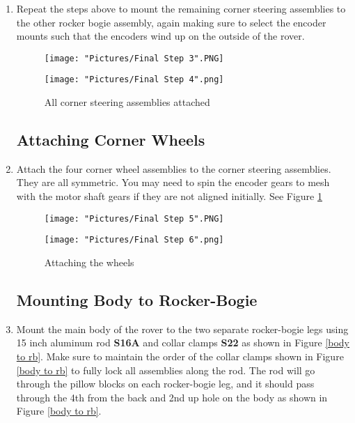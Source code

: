 \documentclass[12pt]{article}
\begin{document}
\begin{enumerate}
\item Repeat the steps above to mount the remaining corner steering assemblies to the other rocker bogie assembly, again making sure to select the encoder mounts such that the encoders wind up on the outside of the rover. 

\begin{figure}[H]
  \centering
  \begin{minipage}[b]{0.45\textwidth}
    \texttt{[image: "Pictures/Final Step 3".PNG]}
  \end{minipage}
  \hfill
  \begin{minipage}[b]{0.45\textwidth}
    \texttt{[image: "Pictures/Final Step 4".png]}
  \end{minipage}
  \caption{All corner steering assemblies attached}
\end{figure}

\subsection{Attaching Corner Wheels}

\item Attach the four corner wheel assemblies to the corner steering assemblies. They are all symmetric. You may need to spin the encoder gears to mesh with the motor shaft gears if they are not aligned initially. See Figure \ref{wheels finished}

\begin{figure}[H]
  \centering
  \begin{minipage}[b]{0.45\textwidth}
    \texttt{[image: "Pictures/Final Step 5".PNG]}
  \end{minipage}
  \hfill
  \begin{minipage}[b]{0.45\textwidth}
    \texttt{[image: "Pictures/Final Step 6".png]}
  \end{minipage}
  \caption{Attaching the wheels}
  \label{wheels finished}
\end{figure}

\subsection{Mounting Body to Rocker-Bogie}

\item Mount the main body of the rover to the two separate rocker-bogie legs using 15 inch aluminum rod \textbf{S16A} and collar clamps \textbf{S22} as shown in Figure \ref{body to rb}. Make sure to maintain the order of the collar clamps shown in Figure \ref{body to rb} to fully lock all assemblies along the rod. The rod will go through the pillow blocks on each rocker-bogie leg, and it should pass through the 4th from the back and 2nd up hole on the body as shown in Figure \ref{body to rb}. 


\end{enumerate}
\end{document}
